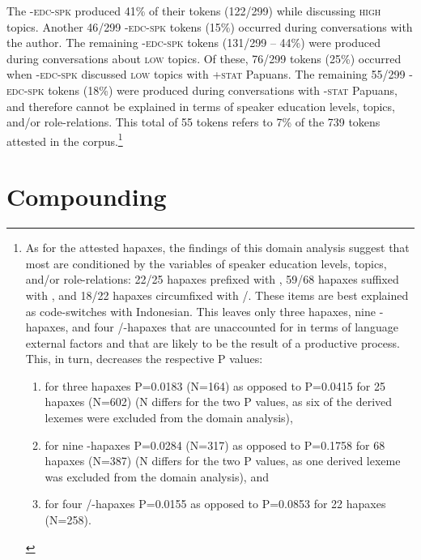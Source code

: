 The \textsc{-edc-spk} produced 41\% of their tokens (122/299) while discussing \textsc{high} topics. Another 46/299 \textsc{-edc-spk} tokens (15\%) occurred during conversations with the author. The remaining \textsc{-edc-spk} tokens (131/299 – 44\%) were produced during conversations about \textsc{low} topics. Of these, 76/299 tokens (25\%) occurred when \textsc{-edc-spk} discussed \textsc{low} topics with \textsc{+stat} Papuans. The remaining 55/299 \mbox{\textsc{-edc-spk}} tokens (18\%) were produced during conversations with \textsc{-stat} Papuans, and 
therefore cannot be explained in terms of speaker education levels, topics, and/or role-relations. 
This total of 55 tokens refers to 7\% of the 739 tokens attested in the corpus.\footnote{As for the attested hapaxes, the findings of this domain analysis suggest that most are conditioned by the variables of speaker education levels, topics, and/or role-relations: 22/25 hapaxes prefixed with , 59/68 hapaxes suffixed with , and 18/22 hapaxes circumfixed with /. These items are best explained as code-switches with Indonesian. This leaves only three hapaxes, nine -hapaxes, and four /-hapaxes that are unaccounted for in terms of language external factors and that are likely to be the result of a productive  process. This, in turn, decreases the respective P values:
 
\begin{enumerate}[label=(\arabic*)]
\item for three hapaxes P=0.0183 (N=164) as opposed to P=0.0415 for 25 hapaxes (N=602) (N differs for the two P values, as six of the derived lexemes were excluded from the domain analysis),
\item for nine -hapaxes P=0.0284 (N=317) as opposed to P=0.1758 for 68 hapaxes (N=387) (N differs for the two P values, as one derived lexeme was excluded from the domain analysis), and
\item	 for four /-hapaxes P=0.0155 as opposed to P=0.0853 for 22 hapaxes (N=258).

\end{enumerate}
}

\section{Compounding}\label{Para_3.2}

